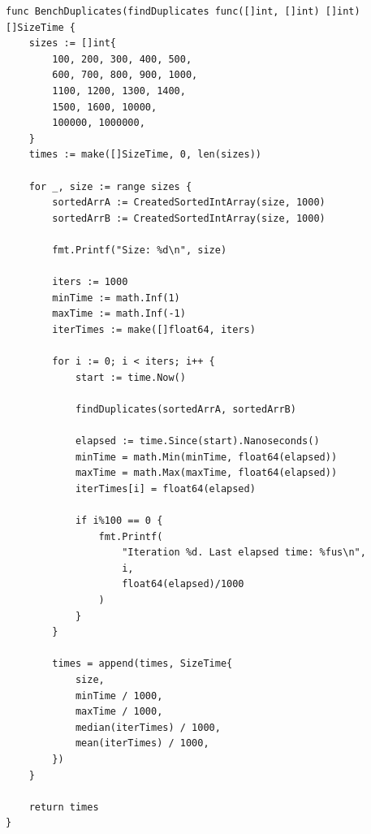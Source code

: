 \documentclass[a4paper,11pt]{article}
\begin{document}
\begin{appendices}
        \begin{verbatim}
func BenchDuplicates(findDuplicates func([]int, []int) []int) []SizeTime {
    sizes := []int{
        100, 200, 300, 400, 500,
        600, 700, 800, 900, 1000,
        1100, 1200, 1300, 1400,
        1500, 1600, 10000,
        100000, 1000000,
    }
    times := make([]SizeTime, 0, len(sizes))

    for _, size := range sizes {
        sortedArrA := CreatedSortedIntArray(size, 1000)
        sortedArrB := CreatedSortedIntArray(size, 1000)

        fmt.Printf("Size: %d\n", size)

        iters := 1000
        minTime := math.Inf(1)
        maxTime := math.Inf(-1)
        iterTimes := make([]float64, iters)

        for i := 0; i < iters; i++ {
            start := time.Now()

            findDuplicates(sortedArrA, sortedArrB)

            elapsed := time.Since(start).Nanoseconds()
            minTime = math.Min(minTime, float64(elapsed))
            maxTime = math.Max(maxTime, float64(elapsed))
            iterTimes[i] = float64(elapsed)

            if i%100 == 0 {
                fmt.Printf(
                    "Iteration %d. Last elapsed time: %fus\n",
                    i,
                    float64(elapsed)/1000
                )
            }
        }

        times = append(times, SizeTime{
            size,
            minTime / 1000,
            maxTime / 1000,
            median(iterTimes) / 1000,
            mean(iterTimes) / 1000,
        })
    }

    return times
}
        \end{verbatim}
    \end{appendices}


\end{document}
